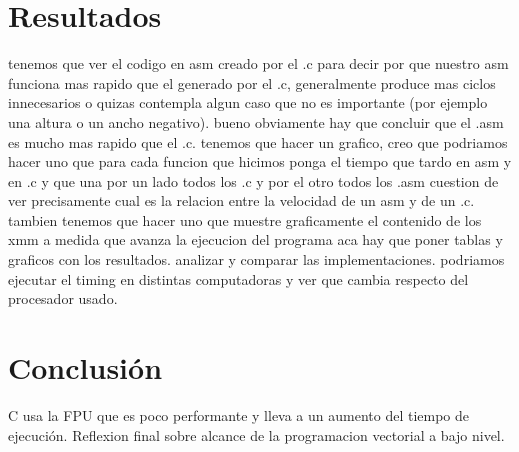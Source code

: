 \documentclass[10pt, a4paper]{article}
\begin{document}
\section{Resultados}
tenemos que ver el codigo en asm creado por el .c para decir por que nuestro asm funciona mas rapido que el generado por el .c, generalmente produce mas ciclos innecesarios o quizas contempla algun caso que no es importante (por ejemplo una altura o un ancho negativo). bueno obviamente hay que concluir que el .asm es mucho mas rapido que el .c.\newline
tenemos que hacer un grafico, creo que podriamos hacer uno que para cada funcion que hicimos ponga el tiempo que tardo en asm y en .c y que una por un lado todos los .c y por el otro todos los .asm cuestion de ver precisamente cual es la relacion entre la velocidad de un asm y de un .c. tambien tenemos que hacer uno que muestre graficamente el contenido de los xmm a medida que avanza la ejecucion del programa\newline
aca hay que poner tablas y graficos con los resultados. analizar y comparar las implementaciones. podriamos ejecutar el timing en distintas computadoras y ver que cambia respecto del procesador usado.
\section{Conclusi\'on}
C usa la FPU que es poco performante y lleva a un aumento del tiempo de ejecución.\newline
Reflexion final sobre alcance de la programacion vectorial a bajo nivel. 
\end{document}
